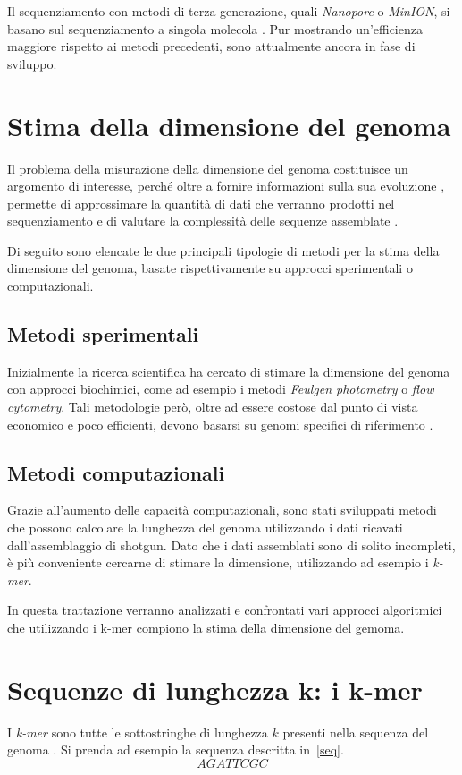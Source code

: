 \documentclass[crop=false, class=book]{standalone}
\begin{document}
		Il sequenziamento con metodi di terza generazione, quali \textit{Nanopore} o \textit{MinION}, si basano sul sequenziamento a singola molecola \cite{shendure2017DNA}. Pur mostrando un'efficienza maggiore rispetto ai metodi precedenti, sono attualmente ancora in fase di sviluppo.
		
	
	\section{Stima della dimensione del genoma}
	Il problema della misurazione della dimensione del genoma costituisce un argomento di interesse, perché oltre a fornire informazioni sulla sua evoluzione \cite{gregory2005synergy}, permette di approssimare la quantità di dati che verranno prodotti nel sequenziamento e di valutare la complessità delle sequenze assemblate \cite{sun2017findGSE}. 
	
	Di seguito sono elencate le due principali tipologie di metodi per la stima della dimensione del genoma, basate rispettivamente su approcci sperimentali o computazionali.
	
		\subsection{Metodi sperimentali}
		Inizialmente la ricerca scientifica ha cercato di stimare la dimensione del genoma con approcci biochimici, come ad esempio i metodi \textit{Feulgen photometry} o \textit{flow cytometry}. Tali metodologie però, oltre ad essere costose dal punto di vista economico e poco efficienti, devono basarsi su genomi specifici di riferimento \cite{pucker2019MGSE, sun2017findGSE}.

		\subsection{Metodi computazionali}
		Grazie all'aumento delle capacità computazionali, sono stati sviluppati metodi che possono calcolare la lunghezza del genoma utilizzando i dati ricavati dall'assemblaggio di shotgun. Dato che i dati assemblati sono di solito incompleti, è più conveniente cercarne di stimare la dimensione, utilizzando ad esempio i \textit{k-mer}. 
		
		In questa trattazione verranno analizzati e confrontati vari approcci algoritmici che utilizzando i k-mer compiono la stima della dimensione del gemoma.
	
	
	\section{Sequenze di lunghezza k: i k-mer}
	I \textit{k-mer} sono tutte le sottostringhe di lunghezza $k$ presenti nella sequenza del genoma \cite{marcais2011fast}. Si prenda ad esempio la sequenza descritta in~\vref{seq}. 
	\begin{equation}
	\label{seq}
		AGATTCGC 
	\end{equation}
	
\end{document}
